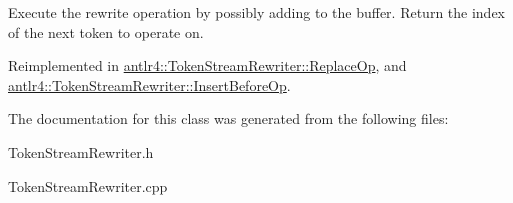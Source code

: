 Execute the rewrite operation by possibly adding to the buffer. Return the index of the next token to operate on. 

Reimplemented in \hyperlink{classantlr4_1_1TokenStreamRewriter_1_1ReplaceOp_af530710355bab587a6ff70f889e3eec3}{antlr4\+::\+Token\+Stream\+Rewriter\+::\+Replace\+Op}, and \hyperlink{classantlr4_1_1TokenStreamRewriter_1_1InsertBeforeOp_a3370a856de310970f4448c0aff90244e}{antlr4\+::\+Token\+Stream\+Rewriter\+::\+Insert\+Before\+Op}.



The documentation for this class was generated from the following files\+:\begin{DoxyCompactItemize}
\item 
Token\+Stream\+Rewriter.\+h\item 
Token\+Stream\+Rewriter.\+cpp\end{DoxyCompactItemize}
